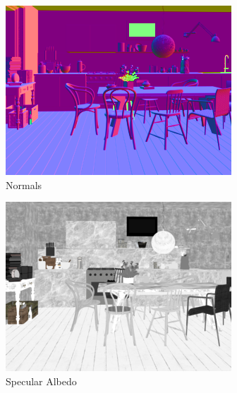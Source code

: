 \begin{figure}
\begin{subfigure}{0.3\linewidth}
    \includegraphics[width=\linewidth]{praca/images/AI43_001_Cam01.VRaySamplerInfoNormal.png}
    \caption{Normals}
  \end{subfigure}
  \begin{subfigure}{0.3\linewidth}
    \includegraphics[width=\linewidth]{praca/images/AI43_001_Cam01.VRayRawReflectionFilter.png}
    \caption{Specular Albedo}
  \end{subfigure}
  \begin{subfigure}{0.3\linewidth}

\end{subfigure}
\end{figure}
